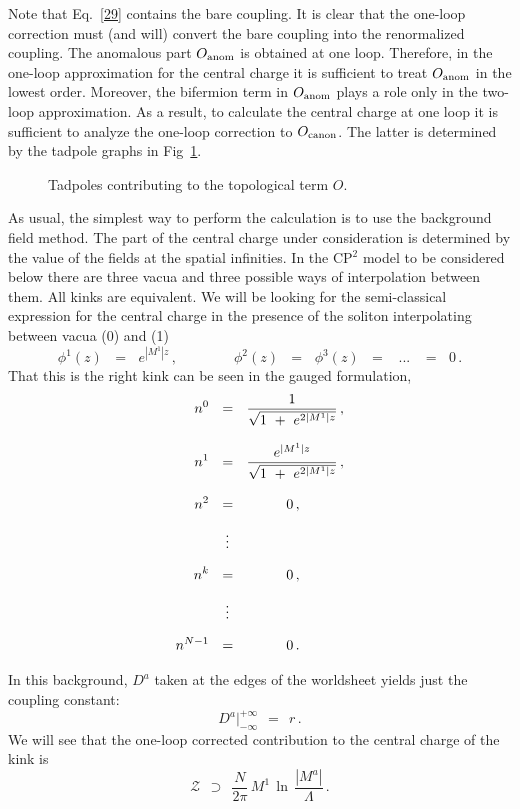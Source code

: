 \documentclass[epsfig,12pt]{article}
\def\beq{\begin{equation}}
\def\eeq{\end{equation}}
\def\beq{\begin{equation}}
\def\eeq{\end{equation}}
\newcommand{\mc}[1]{\mathcal{#1}}
\begin{document}
	Note that Eq.~\eqref{29} contains the bare coupling. 
	It is clear that the one-loop correction must (and will) convert the bare coupling  into the renormalized coupling. 
	The anomalous part $O_{\rm anom}$ is obtained at one loop.
	Therefore, in the one-loop approximation for the central charge 
	it is sufficient to treat $O_{\rm anom}$ in the lowest order. Moreover, the bifermion term 
	in $O_{\rm anom}$ plays a role only in the two-loop approximation. 
	As a result, to calculate the central charge at one loop it is sufficient to analyze 
	the one-loop correction to $O_{\rm canon}$. 
	The latter is determined by the tadpole graphs in Fig~\ref{ftad}. 
\begin{figure}
\begin{center}
\epsfxsize=8.0cm
\caption{Tadpoles contributing to the topological term $ O $.}
\label{ftad}
\end{center}
\end{figure}
	As usual, the simplest way to perform the calculation is to use the background field method.
	The part of the central charge under consideration is determined by the value of the fields at the spatial infinities. 
	In the CP$^2$ model to be considered below there are three vacua and three possible ways
	of interpolation between them. All kinks are equivalent. 
	We will be looking for the semi-classical expression for the central charge in the presence
	of the soliton interpolating between vacua ({\sc \small 0}) and ({\sc \small 1})
\beq
	\phi^1(z)  \,~~=~~\, e^{|M^1| z}\,, \qquad\qquad  \phi^2(z) \,~~=~~\, \phi^3(z) \,~~=~~ \,~...~\, ~~=~~\, 0\,.
\eeq
	That this is the right kink can be seen in the gauged formulation,
\begin{align}
%
\notag
	n^0  & ~~=~~ \frac {             1              }
 	                   {\sqrt{ 1 ~+~ e^{2 |M^1| z} }}\,, \\[3mm]
%
\notag
	n^1  & ~~=~~ \frac {         e^{|M^1| z}        }
 	                   {\sqrt{ 1 ~+~ e^{2 |M^1| z} }}\,, \\[3mm]
%
\notag
	n^2  & ~~=~~ \qquad~~\, 0\,,  \\[2mm]
%	 
	     & ~~~\,\vdots          \\[2mm]
%
\notag
	n^k  & ~~=~~ \qquad~~\, 0\,,  \\[2mm]
%	 
\notag
 	     & ~~~\,\vdots          \\[2mm]
%
\notag
	n^{N-1} & ~~=~~ \qquad~~\, 0\,.                
\end{align}

	In this background, $ D^a $ taken at the edges of the worldsheet yields just the coupling constant:
\beq
	D^a \Big|^{\scriptscriptstyle +\infty}_{\scriptscriptstyle -\infty} ~~=~~    r\,.
\eeq
	We will see that the one-loop corrected contribution to the central charge of the kink is
\beq
       \mc{Z} ~~\supset~~ \frac{N}{2\pi}\, M^1\, \ln\, \frac{   |M^a|   }
                                                            {  \Lambda  }\,.
\eeq
\end{document}
